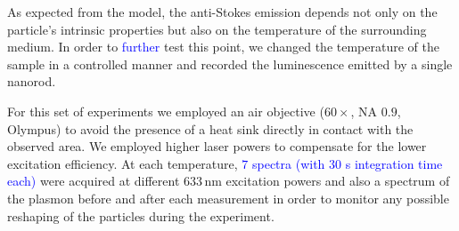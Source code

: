 \documentclass[journal=nalefd,manuscript=letter]{achemso}
\newcommand{\HI}[1]{\textcolor{blue}{#1}} %
\newcommand{\nm}{\ensuremath{\,\textrm{nm}}}
\begin{document}

As expected from the model, the anti-Stokes emission depends not only on
the particle's intrinsic properties but also on the temperature of the
surrounding medium\cite{Konrad2013}. In order to \HI{further} test this point, we changed the
temperature of the sample in a controlled manner and recorded the luminescence
emitted by a single nanorod.

For this set of experiments we employed an air objective ($60\times$, NA $0.9$,
Olympus) to avoid the presence of a heat sink directly in contact with the
observed area. We employed higher laser powers to compensate for the lower
excitation efficiency. At each temperature, \HI{$7$ spectra (with $30$ s 
integration time each)} were acquired at different
$633\nm$ excitation powers and also a spectrum of the plasmon before and after
each measurement in order to monitor any possible reshaping of the particles
during the experiment.
\end{document}

